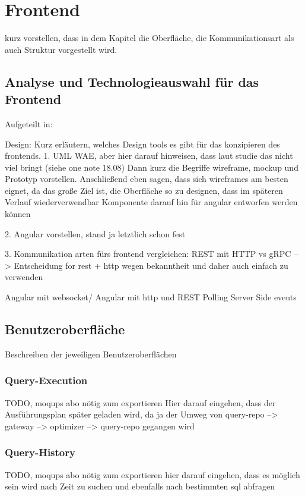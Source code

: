 \section{Frontend}
kurz vorstellen, dass in dem Kapitel die Oberfläche, die Kommunikationsart als auch Struktur vorgestellt wird.


\subsection{Analyse und Technologieauswahl für das Frontend}
Aufgeteilt in:

Design:
Kurz erläutern, welches Design tools es gibt für das konzipieren des frontends.
1. UML WAE, aber hier darauf hinweisen, dass laut studie das nicht viel bringt (siehe one note 18.08)
Dann kurz die Begriffe wireframe, mockup und Prototyp vorstellen.
Anschließend eben sagen, dass sich wireframes am besten eignet, da das große Ziel ist, die Oberfläche so zu designen, dass im späteren Verlauf wiederverwendbar Komponente darauf hin für angular entworfen werden können

2. Angular vorstellen, stand ja letztlich schon fest

3. Kommunikation arten fürs frontend vergleichen:
REST mit HTTP vs gRPC --> Entscheidung for rest + http wegen bekanntheit und daher auch einfach zu verwenden

Angular mit websocket/ Angular mit http und REST
Polling
Server Side events

\subsection{Benutzeroberfläche}
Beschreiben der jeweiligen Benutzeroberflächen

\subsubsection{Query-Execution}
TODO, moqups abo nötig zum exportieren
Hier darauf eingehen, dass der Ausführungsplan später geladen wird, da ja der Umweg von query-repo --> gateway --> optimizer --> query-repo gegangen wird

\subsubsection{Query-History}
TODO, moqups abo nötig zum exportieren
hier darauf eingehen, dass es möglich sein wird nach Zeit zu suchen und ebenfalls nach bestimmten sql abfragen

